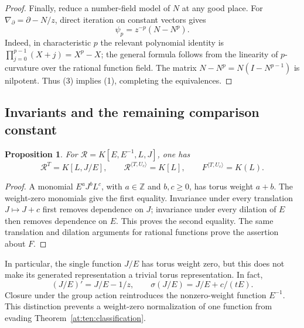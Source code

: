 \documentclass[11pt,a4paper]{article}
\newtheorem{proposition}[theorem]{Proposition}
\theoremstyle{definition}
\theoremstyle{remark}
\numberwithin{equation}{section}
\begin{document}
\begin{proof}
Finally, reduce a number-field model of $N$ at any good place.
For $\nabla_\partial=\partial-N/z$, direct iteration on constant
vectors gives
\[
 \psi_p=z^{-p}(N-N^p).
\]
Indeed, in characteristic $p$ the relevant polynomial identity is
$\prod_{j=0}^{p-1}(X+j)=X^p-X$; the general formula follows from
the linearity of $p$-curvature over the rational function field.
The matrix $N-N^p=N(I-N^{p-1})$ is nilpotent.  Thus (3) implies (1),
completing the equivalences.
\end{proof}

\subsection{Invariants and the remaining comparison constant}

\begin{proposition}\label{at:ten:invariants}
For $\mathcal R=K[E,E^{-1},L,J]$, one has
\[
 \mathcal R^T=K[L,J/E],\qquad
 \mathcal R^{\langle T,U_c\rangle}=K[L],\qquad
 F^{\langle T,U_c\rangle}=K(L).
\]
\end{proposition}

\begin{proof}
A monomial $E^aJ^bL^c$, with $a\in\mathbb Z$ and $b,c\ge0$,
has torus weight $a+b$.  The weight-zero monomials give the first
equality.  Invariance under every translation $J\mapsto J+c$
first removes dependence on $J$; invariance under every dilation of
$E$ then removes dependence on $E$.  This proves the second equality.
The same translation and dilation arguments for rational functions
prove the assertion about $F$.
\end{proof}

In particular, the single function $J/E$ has torus weight zero, but
this does not make its generated representation a trivial torus
representation.  In fact,
\[
 (J/E)'=J/E-1/z,\qquad
 \sigma(J/E)=J/E+c/(tE).
\]
Closure under the group action reintroduces the nonzero-weight
function $E^{-1}$.  This distinction prevents a weight-zero
normalization of one function from evading
Theorem~\ref{at:ten:classification}.
\end{document}

